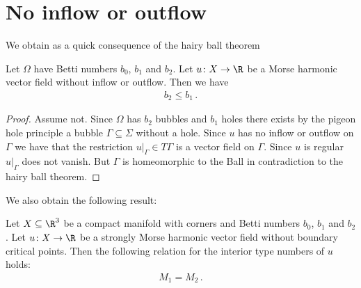 \section{No inflow or outflow}
We obtain as a quick consequence of the hairy ball theorem
\begin{proposition}
  Let $\Omega$ have Betti numbers $b_0$, $b_1$ and $b_2$.
  Let $u\colon X\to\R$
  be a Morse harmonic vector field without inflow or outflow. Then we have
  \begin{align*}
    b_2\leq b_1\,.
  \end{align*}
\end{proposition}
\begin{proof} 
  Assume not. Since $\Omega$ has $b_2$ bubbles and $b_1$ holes there exists by the pigeon hole
  principle a bubble $\Gamma\subseteq\Sigma$ without a hole. Since $u$ has no inflow or outflow on $\Gamma$ we
  have that the restriction $u\vert_\Gamma\in T\Gamma$ is a vector field on $\Gamma$. Since $u$ is regular
  $u\vert_\Gamma$ does not vanish. But $\Gamma$ is homeomorphic to the Ball in contradiction to the hairy ball theorem.
\end{proof}
We also obtain the following result:
\begin{proposition}
  Let $X\subseteq\R^3$ be a compact manifold with corners and Betti numbers $b_0$, $b_1$ and $b_2$.
  Let $u\colon X\to\R$ be a strongly Morse harmonic vector field without boundary critical points.
  Then the following relation for
  the interior type numbers of $u$ holds:
  \begin{align*}
    M_1=M_2\,.
  \end{align*}
\end{proposition}
